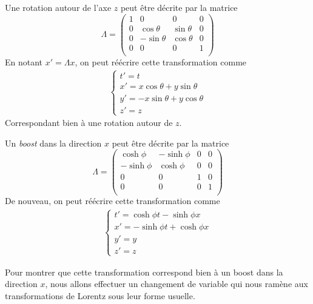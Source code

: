 \begin{exmp}
    Une rotation autour de l'axe $z$ peut être décrite par la matrice
    \begin{equation}
        \Lambda = \begin{pmatrix}
1 & 0 & 0 & 0\\
0 & \cos{\theta} & \sin{\theta} & 0\\
0 & -\sin{\theta} & \cos{\theta} & 0\\
0 & 0 & 0 & 1\\
\end{pmatrix}
    \end{equation}
    En notant $x'=\Lambda x$, on peut réécrire cette transformation comme
    \begin{align}
    \left\{
\begin{array}{l}
  t' =t \\
  x' = x\cos{\theta} + y\sin{\theta}\\
  y' = -x\sin{\theta} + y\cos{\theta}\\
  z' = z
\end{array}
\right.
\end{align}
Correspondant bien à une rotation autour de $z$.
\end{exmp}


\begin{exmp}
    Un \textit{boost} dans la direction $x$ peut être décrite par la matrice
    \begin{equation}
        \Lambda = \begin{pmatrix}
\cosh{\phi}& -\sinh{\phi} & 0 & 0\\
-\sinh{\phi} & \cosh{\phi} & 0 & 0\\
0 & 0 & 1 & 0\\
0 & 0 & 0 & 1\\
\end{pmatrix}
    \end{equation}
    De nouveau, on peut réécrire cette transformation comme 
\begin{align}
\label{eq:4.2.1}
    \left\{
\begin{array}{l}
  t' = \cosh{\phi}t - \sinh{\phi}x \\
  x' = -\sinh{\phi}t + \cosh{\phi}x\\
  y' = y\\
  z' = z
\end{array}
\right.
\end{align}
\end{exmp}
Pour montrer que cette transformation correspond bien à un boost dans la direction $x$, nous allons effectuer un changement de variable qui nous ramène aux transformations de Lorentz sous leur forme usuelle.


